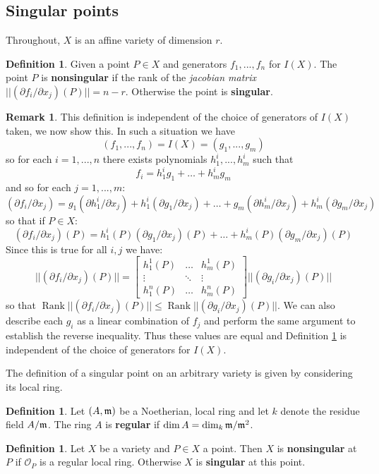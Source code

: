 \documentclass[12pt]{article}
\theoremstyle{plain}
\theoremstyle{definition}
\newtheorem{defn}[thm]{Definition} %
\newtheorem{remark}[thm]{Remark}
\newcommand{\call}[1]{\mathcal{#1}}
\begin{document}
\subsection{Singular points}
Throughout, $X$ is an affine variety of dimension $r$.
\begin{defn}
\label{def:singular_point}
Given a point $P \in X$ and generators $f_1,...,f_n$ for $I(X)$. The point $P$ is \textbf{nonsingular} if the rank of the \emph{jacobian matrix} $|| (\partial f_i/\partial x_j)(P)|| = n - r$. Otherwise the point is \textbf{singular}.
\end{defn}
\begin{remark}\label{rmk:defining_functions_invariant}
This definition is independent of the choice of generators of $I(X)$ taken, we now show this. In such a situation we have
\[(f_1,...,f_n) = I(X) = (g_1,...,g_m)\]
so for each $i=1,...,n$ there exists polynomials $h_1^i,...,h_m^i$ such that
\[f_i = h_1^i g_1 + \hdots + h_m^i g_m\]
and so for each $j = 1,...,m$:
\[(\partial f_i/\partial x_j) = g_1(\partial h_1^i/\partial x_j) + h_1^i(\partial g_1/\partial x_j) + \hdots + g_m(\partial h_m^i/\partial x_j) + h_m^i(\partial g_m/\partial x_j)\]
so that if $P \in X$:
\[(\partial f_i/\partial x_j)(P) = h_1^i(P)(\partial g_1/\partial x_j)(P) + \hdots + h_m^i(P)(\partial g_m/\partial x_j)(P)\]
Since this is true for all $i,j$ we have:
\[
||(\partial f_i/\partial x_j)(P)|| =
\begin{bmatrix}
h_1^1(P) & \hdots & h_m^1(P)\\
\vdots & \ddots & \vdots\\
h_1^n(P) & \hdots & h_m^n(P)
\end{bmatrix}
||(\partial g_i/\partial x_j)(P)||
\]
so that $\operatorname{Rank}||(\partial f_i/\partial x_j)(P)|| \leq \operatorname{Rank}||(\partial g_i/\partial x_j)(P)||$. We can also describe each $g_i$ as a linear combination of $f_j$ and perform the same argument to establish the reverse inequality. Thus these values are equal and Definition \ref{def:singular_point} is independent of the choice of generators for $I(X)$.
\end{remark}
The definition of a singular point on an arbitrary variety is given by considering its local ring.
\begin{defn}
Let $(A,\frak{m})$ be a Noetherian, local ring and let $k$ denote the residue field $A/\frak{m}$. The ring $A$ is \textbf{regular} if $\operatorname{dim}A = \operatorname{dim}_k\frak{m}/\frak{m}^2$.
\end{defn}
\begin{defn}\label{def:singular}
Let $X$ be a variety and $P \in X$ a point. Then $X$ is \textbf{nonsingular} at $P$ if $\call{O}_P$ is a regular local ring. Otherwise $X$ is \textbf{singular} at this point.
\end{defn}
\end{document}
